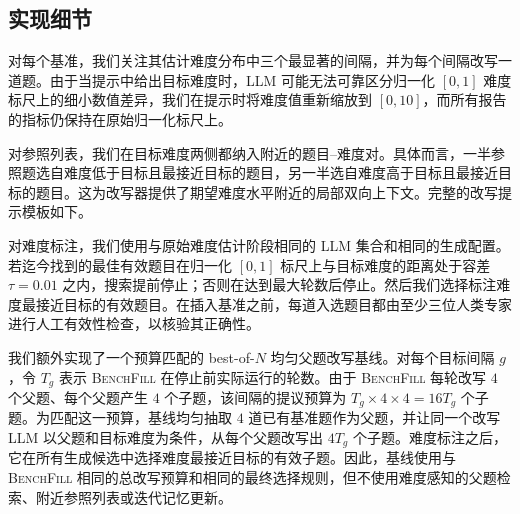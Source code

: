\subsection{实现细节}
\label{sec:app_gap}


对每个基准，我们关注其估计难度分布中三个最显著的间隔，并为每个间隔改写一道题。由于当提示中给出目标难度时，LLM 可能无法可靠区分归一化 $[0,1]$ 难度标尺上的细小数值差异，我们在提示时将难度值重新缩放到 $[0,10]$，而所有报告的指标仍保持在原始归一化标尺上。

对参照列表，我们在目标难度两侧都纳入附近的题目--难度对。具体而言，一半参照题选自难度低于目标且最接近目标的题目，另一半选自难度高于目标且最接近目标的题目。这为改写器提供了期望难度水平附近的局部双向上下文。完整的改写提示模板如下。

对难度标注，我们使用与原始难度估计阶段相同的 LLM 集合和相同的生成配置。若迄今找到的最佳有效题目在归一化 $[0,1]$ 标尺上与目标难度的距离处于容差 $\tau=0.01$ 之内，搜索提前停止；否则在达到最大轮数后停止。然后我们选择标注难度最接近目标的有效题目。在插入基准之前，每道入选题目都由至少三位人类专家进行人工有效性检查，以核验其正确性。

我们额外实现了一个预算匹配的 best-of-\(N\) 均匀父题改写基线。对每个目标间隔 \(g\)，令 \(T_g\) 表示 \textsc{BenchFill} 在停止前实际运行的轮数。由于 \textsc{BenchFill} 每轮改写 \(4\) 个父题、每个父题产生 \(4\) 个子题，该间隔的提议预算为 \(T_g \times 4 \times 4 = 16T_g\) 个子题。为匹配这一预算，基线均匀抽取 \(4\) 道已有基准题作为父题，并让同一个改写 LLM 以父题和目标难度为条件，从每个父题改写出 \(4T_g\) 个子题。难度标注之后，它在所有生成候选中选择难度最接近目标的有效子题。因此，基线使用与 \textsc{BenchFill} 相同的总改写预算和相同的最终选择规则，但不使用难度感知的父题检索、附近参照列表或迭代记忆更新。

